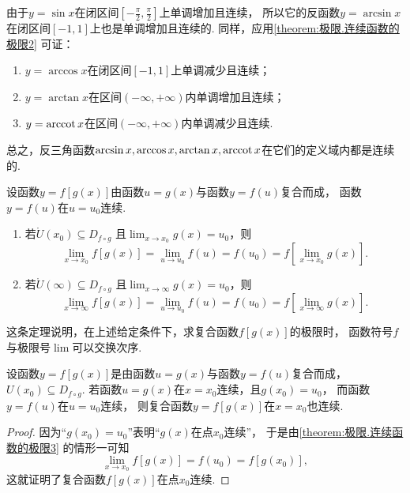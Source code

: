 \begin{example}
由于\(y=\sin x\)在闭区间\(\left[-\frac{\pi}{2},\frac{\pi}{2}\right]\)上单调增加且连续，
所以它的反函数\(y=\arcsin x\)在闭区间\([-1,1]\)上也是单调增加且连续的.
同样，应用\cref{theorem:极限.连续函数的极限2} 可证：
\begin{enumerate}
	\item \(y=\arccos x\)在闭区间\([-1,1]\)上单调减少且连续；
	\item \(y=\arctan x\)在区间\((-\infty,+\infty)\)内单调增加且连续；
	\item \(y=\arccot x\)在区间\((-\infty,+\infty)\)内单调减少且连续.
\end{enumerate}
总之，反三角函数\(\arcsin x,\arccos x,\arctan x,\arccot x\)在它们的定义域内都是连续的.
\end{example}

\begin{theorem}\label{theorem:极限.连续函数的极限3}
\def\D{D_{f \circ g}}
设函数\(y = f[g(x)]\)由函数\(u = g(x)\)与函数\(y = f(u)\)复合而成，
函数\(y = f(u)\)在\(u = u_0\)连续.
\begin{enumerate}
	\item 若\(\mathring{U}(x_0) \subseteq \D\)
	且\(\lim_{x \to x_0}g(x) = u_0\)，则\[
		\lim_{x \to x_0}f[g(x)]
		= \lim_{u \to u_0}f(u) = f(u_0)
		= f\left[ \lim_{x \to x_0} g(x) \right].
	\]

	\item 若\(\mathring{U}(\infty) \subseteq \D\)
	且\(\lim_{x\to\infty}g(x) = u_0\)，则\[
		\lim_{x \to \infty}f[g(x)]
		= \lim_{u \to u_0}f(u) = f(u_0)
		= f\left[ \lim_{x \to \infty} g(x) \right].
	\]
\end{enumerate}
\end{theorem}
这条定理说明，在上述给定条件下，求复合函数\(f[g(x)]\)的极限时，
函数符号\(f\)与极限号\(\lim\)可以交换次序.

\begin{theorem}\label{theorem:极限.连续函数的极限4}
设函数\(y = f[g(x)]\)是由函数\(u = g(x)\)与函数\(y = f(u)\)复合而成，
\(U(x_0) \subseteq D_{f \circ g}\).
若函数\(u = g(x)\)在\(x = x_0\)连续，且\(g(x_0) = u_0\)，
而函数\(y = f(u)\)在\(u = u_0\)连续，
则复合函数\(y = f[g(x)]\)在\(x = x_0\)也连续.
\begin{proof}
因为“\(g(x_0) = u_0\)”表明“\(g(x)\)在点\(x_0\)连续”，
于是由\cref{theorem:极限.连续函数的极限3} 的情形一可知\[
	\lim_{x \to x_0}f[g(x)]
	= f(u_0) = f[g(x_0)],
\]
这就证明了复合函数\(f[g(x)]\)在点\(x_0\)连续.
\end{proof}
\end{theorem}

